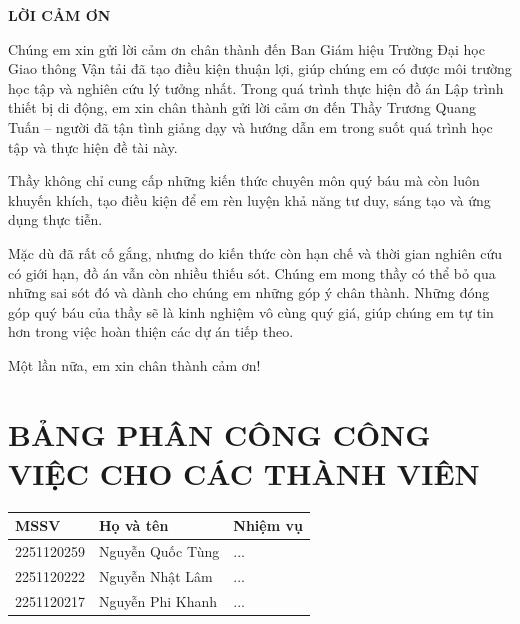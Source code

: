 \documentclass[a4paper,12pt]{article}
\begin{document}
\newpage %
\thispagestyle{empty} %

\begin{center}
    \textbf{\Large LỜI CẢM ƠN}
\end{center}

\onehalfspacing %

\justify %

\noindent Chúng em xin gửi lời cảm ơn chân thành đến Ban Giám hiệu Trường Đại học Giao thông Vận tải đã tạo điều kiện thuận lợi, giúp chúng em có được môi trường học tập và nghiên cứu lý tưởng nhất. Trong quá trình thực hiện đồ án Lập trình thiết bị di động, em xin chân thành gửi lời cảm ơn đến Thầy Trương Quang Tuấn – người đã tận tình giảng dạy và hướng dẫn em trong suốt quá trình học tập và thực hiện đề tài này.

\noindent Thầy không chỉ cung cấp những kiến thức chuyên môn quý báu mà còn luôn khuyến khích, tạo điều kiện để em rèn luyện khả năng tư duy, sáng tạo và ứng dụng thực tiễn.

\noindent Mặc dù đã rất cố gắng, nhưng do kiến thức còn hạn chế và thời gian nghiên cứu có giới hạn, đồ án vẫn còn nhiều thiếu sót. Chúng em mong thầy có thể bỏ qua những sai sót đó và dành cho chúng em những góp ý chân thành. Những đóng góp quý báu của thầy sẽ là kinh nghiệm vô cùng quý giá, giúp chúng em tự tin hơn trong việc hoàn thiện các dự án tiếp theo.

\noindent Một lần nữa, em xin chân thành cảm ơn!

\newpage %
\thispagestyle{empty} %

\section*{\centering \fontsize{16pt}{\baselineskip}\selectfont \textbf{BẢNG PHÂN CÔNG CÔNG VIỆC CHO CÁC THÀNH VIÊN}} %

\begin{center}
\begin{tabular}{|l|l|l|}
\hline
\textbf{MSSV} & \textbf{Họ và tên} & \textbf{Nhiệm vụ} \\
\hline
2251120259& Nguyễn Quốc Tùng & ... \\
\hline
2251120222 & Nguyễn Nhật Lâm & ... \\
\hline
2251120217 & Nguyễn Phi Khanh & ... \\
\hline
\end{tabular}
\end{center}
\end{document}
